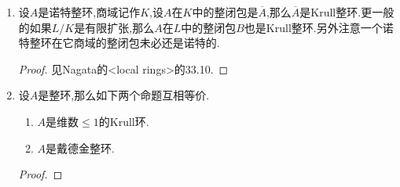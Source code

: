 \begin{enumerate}
\begin{proof}
    	\qquad
    	
    	下面证明第二条.首先按照$K[X]$是PID,它也是Krull环.任取$A$的高度1素理想$p$,那么有$A_p$是DVR,于是按照引理有$A_p[X]$是诺特整闭整环.但是我们解释过诺特整环上Krull环等价于整闭,所以$A_p[X]$是Krull环.下面当$p$跑遍高度1素理想时有$A[X]=\cap A_p[X]\subseteq K[X]$.我们断言有$A_p[X]=A_p[X]_{pA_p[X]}\cap K[X]$:一般的,设$R$是DVR,极大理想为$m$,商域为$K$,那么有$R[X]\subseteq R[X]_{m[X]}\cap K[X]$.反过来如果$\alpha=f/g\in R[X]_{m[x]}$,其中$f\in R[X]$,$g\in R[X]-m[X]$,并且设$\alpha\in K[X]$,那么可记$\alpha=h/c$,其中$h\in R[X]-m[X]$,$c\in R-\{0\}$.那么有$gh=fc\in R[X]$.但是$gh\in A[X]-m[X]$,导致$c$必须是$R$中可逆元,于是$\alpha=hc^{-1}\in A[X]$.于是$R[X]=R[X]_{m[X]}\cap K[X]$.
    	
    	\qquad
    	
    	回到证明.按照断言,上述等式可以写为$A[X]=\left(\cap A_p[X]_{pA_p[X]}\right)\cap K[X]$,其中$p$跑遍高度1素理想.再取$0\not=f\in A[X]$,因为$f$只有有限个非零系数,所以除了有限个高度1素理想以外,对其余高度1素理想$p$都有$f$的非零系数在$A_p$中可逆.于是$f\in A_p[X]_{pA_p[X]}$可逆,从第一条($K[X]$也是Krull环)就得到$A[X]$是Krull环.
    	
    	\qquad
    	
    	再考虑$A[[X]]$.任取$A$的高度1素理想$p$,按照引理$A_p[[X]]$仍然是诺特整闭整环,于是它是Krull环.同样有$A[[X]]=\cap A_p[[X]]$,其中$p$跑遍高度1素理想.按照$A_p[[X]][X^{-1}]\cap K[[X]]=A_p[[X]]$,于是上述等式可以写为$A[[X]]=\left(\cap A_p[[X]][X^{-1}]\right)\cap K[[X]]$.任取$0\not=f\in A[[X]]$,记$f=a_sX^s+a_{s+1}X^{s+1}+\cdots$,设$0\not=a_s\in A$,在$A_p[[X]][X^{-1}]$中单位恰好是$a_s$不在$p$中的$f$.但是只有有限个高度1素理想包含了非零元$a_s$,于是只存在有限个高度1素理想$p$使得$f$不在$A_p[[X]][X^{-1}]$中可逆.于是按照第一条得到$A[[X]]$是Krull环.
    \end{proof}
    \item 设$A$是诺特整环,商域记作$K$,设$A$在$K$中的整闭包是$\overline{A}$,那么$\overline{A}$是Krull整环.更一般的如果$L/K$是有限扩张,那么$A$在$L$中的整闭包$B$也是Krull整环.另外注意一个诺特整环在它商域的整闭包未必还是诺特的.
    \begin{proof}
    	
    	见Nagata的<local rings>的33.10.
    \end{proof}
    \item 设$A$是整环,那么如下两个命题互相等价.
    \begin{enumerate}
    	\item $A$是维数$\le1$的Krull环.
    	\item $A$是戴德金整环.
    \end{enumerate}
    \begin{proof}
    	

\end{proof}
\end{enumerate}
